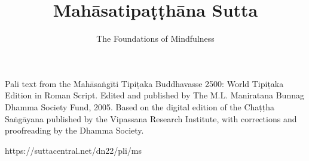 \documentclass[
  babelLanguage=british,
  final,
  toneMarksAbove,
  webversion,
]{chantingbook}
\title{Mahāsatipaṭṭhāna Sutta}
\subtitle{The Foundations of Mindfulness}
\begin{document}
\frontmatter


\ifwebversion
\cleartoverso
\thispagestyle{empty}\mbox{}
\fi


\cleartorecto
\tableofcontents*

\clearpage
\thispagestyle{empty}

{\fontsize{9}{12}\selectfont
\mbox{}

\vfill

Pali text from the Mahāsaṅgīti Tipiṭaka Buddhavasse 2500: World Tipiṭaka Edition
in Roman Script. Edited and published by The M.L. Maniratana Bunnag Dhamma
Society Fund, 2005. Based on the digital edition of the Chaṭṭha Saṅgāyana
published by the Vipassana Research Institute, with corrections and proofreading
by the Dhamma Society.

https://suttacentral.net/dn22/pli/ms

}

\mainmatter

\showpartnumberfalse
\cleartorecto
\thispagestyle{empty}


\artopttrue




\end{document}
